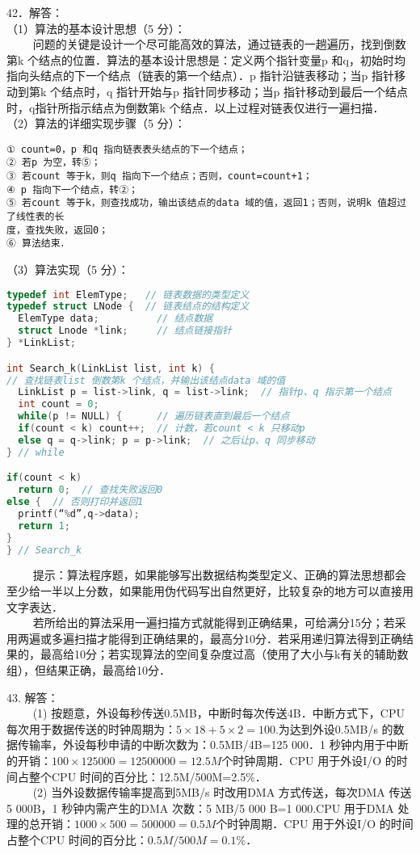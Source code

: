 42．解答： \\
（1）算法的基本设计思想（5 分）： \\
$\qquad$ 问题的关键是设计一个尽可能高效的算法，通过链表的一趟遍历，找到倒数第k 个结点的位置．算法的基本设计思想是：定义两个指针变量p 和q，初始时均指向头结点的下一个结点（链表的第一个结点）．p 指针沿链表移动；当p 指针移动到第k 个结点时，q 指针开始与p 指针同步移动；当p 指针移动到最后一个结点时，q指针所指示结点为倒数第k 个结点．以上过程对链表仅进行一遍扫描． \\
（2）算法的详细实现步骤（5 分）： 
\begin{lstlisting}
① count=0，p 和q 指向链表表头结点的下一个结点；
② 若p 为空，转⑤；
③ 若count 等于k，则q 指向下一个结点；否则，count=count+1；
④ p 指向下一个结点，转②；
⑤ 若count 等于k，则查找成功，输出该结点的data 域的值，返回1；否则，说明k 值超过了线性表的长
度，查找失败，返回0；
⑥ 算法结束．
\end{lstlisting}
（3）算法实现（5 分）： \\
\begin{lstlisting}[language=cpp]
typedef int ElemType;   // 链表数据的类型定义
typedef struct LNode {  // 链表结点的结构定义
  ElemType data;          // 结点数据
  struct Lnode *link;     // 结点链接指针
} *LinkList;

int Search_k(LinkList list, int k) {
// 查找链表list 倒数第k 个结点，并输出该结点data 域的值
  LinkList p = list->link, q = list->link;  // 指针p、q 指示第一个结点
  int count = 0;
  while(p != NULL) {      // 遍历链表直到最后一个结点
  if(count < k) count++;  // 计数，若count < k 只移动p
  else q = q->link; p = p->link;  // 之后让p、q 同步移动
} // while

if(count < k)
  return 0;  // 查找失败返回0
else {  // 否则打印并返回1
  printf(“%d”,q->data);
  return 1;
}
} // Search_k
\end{lstlisting}
$\qquad$ 提示：算法程序题，如果能够写出数据结构类型定义、正确的算法思想都会至少给一半以上分数，如果能用伪代码写出自然更好，比较复杂的地方可以直接用文字表达． \\
$\qquad$ 若所给出的算法采用一遍扫描方式就能得到正确结果，可给满分15分；若采用两遍或多遍扫描才能得到正确结果的，最高分10分．若采用递归算法得到正确结果的，最高给10分；若实现算法的空间复杂度过高（使用了大小与k有关的辅助数组），但结果正确，最高给10分．

43. 解答： \\
$\qquad$ (1) 按题意，外设每秒传送0.5MB，中断时每次传送4B．中断方式下，CPU 每次用于数据传送的时钟周期为：$5\times18+5\times2=100$.为达到外设0.5MB/s 的数据传输率，外设每秒申请的中断次数为：0.5MB/4B=125 000．1 秒钟内用于中断的开销：$100\times125 000=12 500 000=12.5M$个时钟周期．CPU 用于外设I/O 的时间占整个CPU 时间的百分比：12.5M/500M=2.5\%． \\
$\qquad$ (2) 当外设数据传输率提高到5MB/s 时改用DMA 方式传送，每次DMA 传送5 000B，1 秒钟内需产生的DMA 次数：5 MB/5 000 B=1 000.CPU 用于DMA 处理的总开销：$1 000\times500=500 000=0.5M$个时钟周期．CPU 用于外设I/O 的时间占整个CPU 时间的百分比：$0.5M/500M=0.1\%$．

